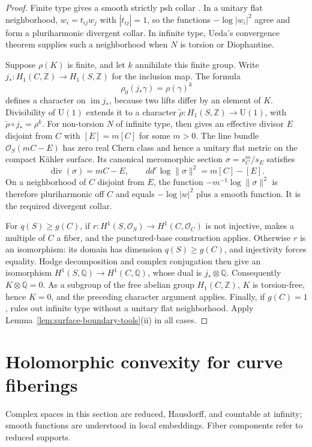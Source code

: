 \documentclass[11pt]{amsart}
\theoremstyle{definition}
\theoremstyle{remark}
\numberwithin{equation}{section}
\newcommand{\OO}{\mathcal O}
\newcommand{\ddc}{dd^c}
\newcommand{\Uone}{\mathrm U(1)}
\begin{document}
\begin{proof}
Finite type gives a smooth strictly psh collar
\cite[Theorem~2.5]{CLPT2018}. In a unitary flat neighborhood,
$w_i=t_{ij}w_j$ with $|t_{ij}|=1$, so the functions
$-\log|w_i|^2$ agree and form a pluriharmonic divergent collar.
In infinite type, Ueda's convergence theorem
\cite[Theorem~3]{Ueda1983} supplies such a neighborhood when $N$
is torsion or Diophantine.

Suppose $\rho(K)$ is finite, and let $k$ annihilate this finite
group. Write $j_*:H_1(C,\mathbb Z)\to H_1(S,\mathbb Z)$ for
the inclusion map. The formula
\[
 \rho_0(j_*\gamma)=\rho(\gamma)^k
\]
defines a character on $\operatorname{im}j_*$, because two lifts
differ by an element of $K$. Divisibility of $\Uone$ extends it
to a character $\widetilde\rho:H_1(S,\mathbb Z)\to\Uone$, with
$\widetilde\rho\circ j_*=\rho^k$. For non-torsion $N$ of infinite
type, \cite[Theorem~4.4]{CLPT2018} then gives an effective divisor
$E$ disjoint from $C$ with $[E]=m[C]$ for some $m>0$.
The line bundle $\OO_S(mC-E)$ has zero real Chern class and hence
a unitary flat metric on the compact K\"ahler surface. Its canonical
meromorphic section $\sigma=s_C^m/s_E$ satisfies
\[
 \operatorname{div}(\sigma)=mC-E,\qquad
 \ddc\log\|\sigma\|^2=m[C]-[E].
\]
On a neighborhood of $C$ disjoint from $E$, the function
$-m^{-1}\log\|\sigma\|^2$ is therefore pluriharmonic off $C$ and
equals $-\log|w|^2$ plus a smooth function. It is the required
divergent collar.

For $q(S)\ge g(C)$, if
$r:H^1(S,\OO_S)\to H^1(C,\OO_C)$ is not injective,
\cite[Proposition~2.7]{CLPT2018} makes a multiple of $C$ a fiber,
and the punctured-base construction applies. Otherwise $r$ is an
isomorphism: its domain has dimension $q(S)\ge g(C)$, and
injectivity forces equality. Hodge decomposition and complex
conjugation then give an isomorphism
$H^1(S,\mathbb Q)\to H^1(C,\mathbb Q)$, whose dual is
$j_*\otimes\mathbb Q$. Consequently $K\otimes\mathbb Q=0$.
As a subgroup of the free abelian group $H_1(C,\mathbb Z)$, $K$
is torsion-free, hence $K=0$, and the preceding character argument
applies.
Finally, if $g(C)=1$, \cite[Theorem~1.6]{CFSTZ2026} rules out
infinite type without a unitary flat neighborhood. Apply
Lemma~\ref{lem:surface-boundary-tools}\textup{(ii)} in all cases.
\end{proof}

\section{Holomorphic convexity for curve fiberings}\label{sec:curve-fibers}
Complex spaces in this section are reduced, Hausdorff, and countable at
infinity; smooth functions are understood in local embeddings. Fiber
components refer to reduced supports.
\end{document}
